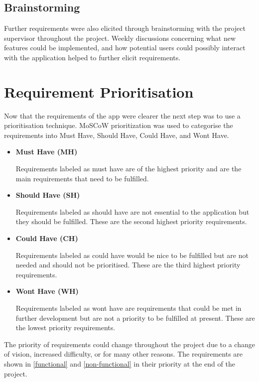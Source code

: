 \subsection{Brainstorming}
Further requirements were also elicited through brainstorming with the project supervisor throughout the project. Weekly discussions concerning what new features could be implemented, and how potential users could possibly interact with the application helped to further elicit requirements.
\section{Requirement Prioritisation}
Now that the requirements of the app were clearer the next step was to use a prioritisation technique. MoSCoW prioritization \cite{moscow} was used to categorise the requirements into Must Have, Should Have, Could Have, and Wont Have.
\begin{itemize}
    \item \textbf{Must Have (MH)} \par
    Requirements labeled as must have are of the highest priority and are the main requirements that need to be fulfilled. 
    \item \textbf{Should Have (SH)} \par
    Requirements labeled as should have are not essential to the application but they should be fulfilled. These are the second highest priority requirements. 
    \item \textbf{Could Have (CH)} \par
    Requirements labeled as could have would be nice to be fulfilled but are not needed and should not be prioritised. These are the third highest priority requirements. 
    \item \textbf{Wont Have (WH)} \par
    Requirements labeled as wont have are requirements that could be met in further development but are not a priority to be fulfilled at present. These are the lowest priority requirements. 
\end{itemize}
The priority of requirements could change throughout the project due to a change of vision, increased difficulty, or for many other reasons. The requirements are shown in \ref{functional} and \ref{non-functional} in their priority at the end of the project.
